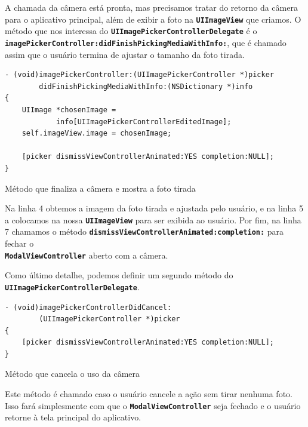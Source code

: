 \documentclass[a4paper,12pt,brazil,oneside]{book}
\begin{document}
A chamada da câmera está pronta, mas precisamos tratar do retorno da câmera para o aplicativo principal, além de exibir a foto na \texttt{\textbf{UIImageView}} que criamos. O método que nos interessa do \texttt{\textbf{UIImagePickerControllerDelegate}} é o\\ \texttt{\textbf{imagePickerController:didFinishPickingMediaWithInfo:}}, que é chamado assim que o usuário termina de ajustar o tamanho da foto tirada.

\begin{listing}[H]
\begin{verbatim}
- (void)imagePickerController:(UIImagePickerController *)picker
        didFinishPickingMediaWithInfo:(NSDictionary *)info
{
    UIImage *chosenImage =
            info[UIImagePickerControllerEditedImage];
    self.imageView.image = chosenImage;
    
    [picker dismissViewControllerAnimated:YES completion:NULL];
}
\end{verbatim}
\caption{Método que finaliza a câmera e mostra a foto tirada}
\end{listing}


Na linha 4 obtemos a imagem da foto tirada e ajustada pelo usuário, e na linha 5 a colocamos na nossa \texttt{\textbf{UIImageView}} para ser exibida ao usuário. Por fim, na linha 7 chamamos o método \texttt{\textbf{dismissViewControllerAnimated:completion:}} para fechar o\\ \texttt{\textbf{ModalViewController}} aberto com a câmera.

Como último detalhe, podemos definir um segundo método do\\ \texttt{\textbf{UIImagePickerControllerDelegate}}.

\begin{listing}[H]
\begin{verbatim}
- (void)imagePickerControllerDidCancel:
        (UIImagePickerController *)picker
{
    [picker dismissViewControllerAnimated:YES completion:NULL];
}
\end{verbatim}
\caption{Método que cancela o uso da câmera}
\end{listing}


Este método é chamado caso o usuário cancele a ação sem tirar nenhuma foto. Isso fará simplesmente com que o \texttt{\textbf{ModalViewController}} seja fechado e o usuário retorne à tela principal do aplicativo.
\end{document}

